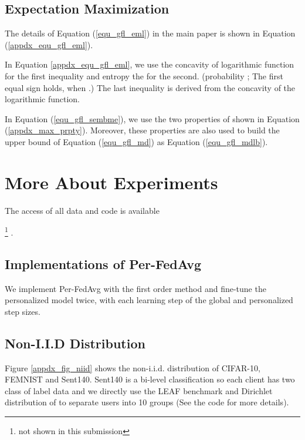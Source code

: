 \documentclass{article}
\begin{document}
\subsection{Expectation Maximization}
\label{appdx_ssec_em}
The details of Equation (\ref{equ_gfl_eml}) in the main paper is shown in Equation (\ref{appdx_equ_gfl_eml}).

In Equation \ref{appdx_equ_gfl_eml}, we use the concavity of logarithmic function for the first inequality and entropy  the for the second. (probability ; The first equal sign holds, when .) The last inequality is derived from the concavity of the logarithmic function.



In Equation (\ref{equ_gfl_sembme}), we use the two properties of  shown in Equation (\ref{appdx_max_prpty}). Moreover, these properties are also used to build the upper bound of Equation (\ref{equ_gfl_md}) as Equation (\ref{equ_gfl_mdlb}).

\section{More About Experiments}
\label{appdx_sec_exp}

The access of all data and code is available

\footnote{not shown in this submission}
.

\subsection{Implementations of Per-FedAvg}

We implement Per-FedAvg with the first order method \cite{fallah2020personalized} and fine-tune the personalized model twice, with each learning step of the global and personalized step sizes.

\subsection{Non-I.I.D Distribution}

Figure \ref{appdx_fig_niid} shows the non-i.i.d. distribution of CIFAR-10, FEMNIST and Sent140. Sent140 is a bi-level classification so each client has two class of label data and we directly use the LEAF benchmark \cite{caldas2018leaf} and Dirichlet distribution of  to separate users into 10 groups (See the code for more details). 
\end{document}
